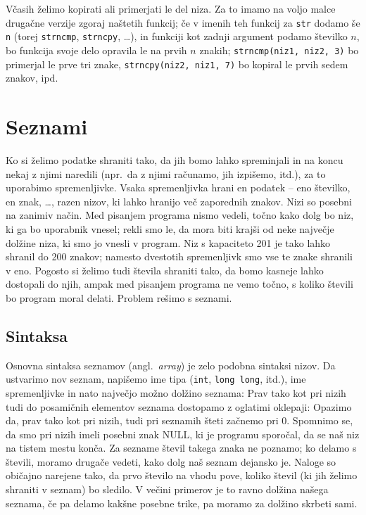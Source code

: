 \documentclass{book}
\begin{document}
Včasih želimo kopirati ali primerjati le del niza.
Za to imamo na voljo malce drugačne verzije zgoraj naštetih funkcij; če v imenih
teh funkcij za \verb+str+ dodamo še \verb+n+ (torej \verb+strncmp+,
\verb+strncpy+, \ldots), in funkciji kot zadnji argument podamo številko $n$, bo
funkcija svoje delo opravila le na prvih $n$ znakih;
\verb+strncmp(niz1, niz2, 3)+ bo primerjal le prve tri znake,
\verb+strncpy(niz2, niz1, 7)+ bo kopiral le prvih sedem znakov, ipd.

\chapter{Seznami}

Ko si želimo podatke shraniti tako, da jih bomo lahko spreminjali in na koncu
nekaj z njimi naredili (npr.~da z njimi računamo, jih izpišemo, itd.), za to
uporabimo spremenljivke.
Vsaka spremenljivka hrani en podatek -- eno številko, en znak, \ldots, razen
nizov, ki lahko hranijo več zaporednih znakov.
Nizi so posebni na zanimiv način.
Med pisanjem programa nismo vedeli, točno kako dolg bo niz, ki ga bo uporabnik
vnesel; rekli smo le, da mora biti krajši od neke največje dolžine niza, ki smo
jo vnesli v program.
Niz s kapaciteto 201 je tako lahko shranil do 200 znakov; namesto dvestotih
spremenljivk smo vse te znake shranili v eno.
Pogosto si želimo tudi števila shraniti tako, da bomo kasneje lahko dostopali do
njih, ampak med pisanjem programa ne vemo točno, s koliko števili bo program
moral delati.
Problem rešimo s seznami.

\section{Sintaksa}

Osnovna sintaksa seznamov (angl.~\textit{array}) je zelo podobna sintaksi nizov.
Da ustvarimo nov seznam, napišemo ime tipa (\verb+int+, \verb+long long+, itd.),
ime spremenljivke in nato največjo možno dolžino seznama:
Prav tako kot pri nizih tudi do posamičnih elementov seznama dostopamo z
oglatimi oklepaji:
Opazimo da, prav tako kot pri nizih, tudi pri seznamih šteti začnemo pri 0.
Spomnimo se, da smo pri nizih imeli posebni znak NULL, ki je programu sporočal,
da se naš niz na tistem mestu konča.
Za sezname števil takega znaka ne poznamo; ko delamo s števili, moramo drugače
vedeti, kako dolg naš seznam dejansko je.
Naloge so običajno narejene tako, da prvo število na vhodu pove, koliko števil
(ki jih želimo shraniti v seznam) bo sledilo.
V večini primerov je to ravno dolžina našega seznama, če pa delamo kakšne
posebne trike, pa moramo za dolžino skrbeti sami.
\end{document}

